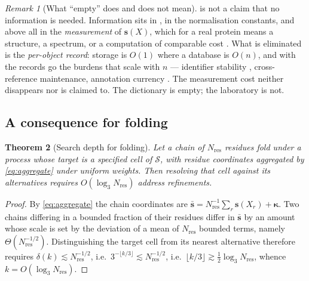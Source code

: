 \documentclass[11pt,twocolumn,a4paper]{article}
\theoremstyle{thmstyle}
\newtheorem{theorem}{Theorem}[section]
\theoremstyle{definition}
\theoremstyle{remark}
\newtheorem{remark}[theorem]{Remark}
\newcommand{\Sspace}{\mathcal{S}}
\newcommand{\Nres}{N_{\mathrm{res}}}
\begin{document}
\begin{remark}[What ``empty'' does and does not mean]
\label{rem:empty-honest}
 is not a claim that no information is
needed. Information sits in , in the normalisation
constants, and above all in the \emph{measurement} of $\mathbf{s}(X)$,
which for a real protein means a structure, a spectrum, or a
computation of comparable cost \citep{jumper2021,varadi2022}. What is
eliminated is the \emph{per-object record}: storage is $O(1)$ where a
database is $O(n)$, and with the records go the burdens that scale
with $n$ --- identifier stability \citep{wren2008,mcmurry2017},
cross-reference maintenance, annotation currency \citep{gaudet2017}.
The measurement cost neither disappears nor is claimed to. The
dictionary is empty; the laboratory is not.
\end{remark}

\subsection{A consequence for folding}

\begin{theorem}[Search depth for folding]
\label{thm:levinthal}
Let a chain of $\Nres$ residues fold under a process whose target is a
specified cell of $\Sspace$, with residue coordinates aggregated by
\eqref{eq:aggregate} under uniform weights. Then resolving that cell
against its alternatives requires $O(\log_3 \Nres)$ address
refinements.
\end{theorem}

\begin{proof}
By \eqref{eq:aggregate} the chain coordinates are $\bar{\mathbf{s}} =
\Nres^{-1}\sum_r \mathbf{s}(X_r) + \boldsymbol\kappa$. Two chains
differing in a bounded fraction of their residues differ in
$\bar{\mathbf{s}}$ by an amount whose scale is set by the deviation of
a mean of $\Nres$ bounded terms, namely $\Theta(\Nres^{-1/2})$.
Distinguishing the target cell from its nearest alternative therefore
requires $\delta(k)\lesssim \Nres^{-1/2}$, i.e.\
$3^{-\lfloor k/3\rfloor}\lesssim \Nres^{-1/2}$, i.e.\
$\lfloor k/3\rfloor \gtrsim \tfrac12\log_3\Nres$, whence
$k = O(\log_3\Nres)$.
\end{proof}
\end{document}
